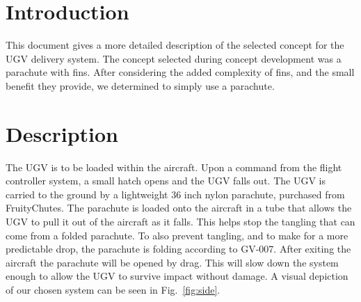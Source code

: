 \documentclass[]{auvsi_doc}
\begin{document}
\begin{AUVSITitlePage}
\begin{artifacttable}
\end{artifacttable}
\end{AUVSITitlePage}

\section{Introduction}
This document gives a more detailed description of the selected concept for the UGV delivery system. The concept selected during concept development was a parachute with fins. After considering the added complexity of fins, and the small benefit they provide, we determined to simply use a parachute.

\section{Description}

The UGV is to be loaded within the aircraft.
Upon a command from the flight controller system, a small hatch opens and the UGV falls out. 
The UGV is carried to the ground by a lightweight 36 inch nylon parachute, purchased from FruityChutes. 
The parachute is loaded onto the aircraft in a tube that allows the UGV to pull it out of the aircraft as it falls. This helps stop the tangling that can come from a folded parachute. To also prevent tangling, and to make for a more predictable drop, the parachute is folding according to GV-007. After exiting the aircraft the parachute will be opened by drag. This will slow down the system enough to allow the UGV to survive impact without damage. A visual depiction of our chosen system can be seen in Fig.~\ref{fig:side}.
\end{document}
